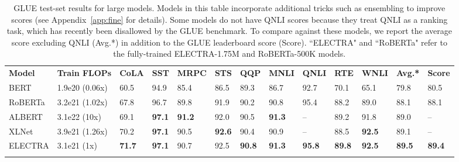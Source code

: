 \documentclass{article}
\newcommand\tstrut{\rule{0pt}{2.6ex}}
\newcommand\bstrut{\rule[-1.0ex]{0pt}{0pt}}
\newcommand{\thinline}{\Xhline{1.5\arrayrulewidth}}
\newcommand{\thickline}{\Xhline{2.5\arrayrulewidth}}
\newcommand{\tsep}	{\bstrut \\ \thinline}
\newcommand{\ttop}{\thickline}
\newcommand{\tbottom}{\bstrut \\ \thickline}
\begin{document}
\addtolength{\tabcolsep}{-3.5pt}
\begin{table}[t!]
\small
\begin{center}
\begin{tabularx}{\linewidth}{X l l l l l l l l l l l l}
\ttop 
\textbf{Model} & \textbf{Train FLOPs} & \textbf{CoLA} & \textbf{SST} & \textbf{MRPC} & \textbf{STS} & \textbf{QQP} & \textbf{MNLI} & \textbf{QNLI} & \textbf{RTE} & \textbf{WNLI} & \textbf{Avg.*} & \textbf{Score} \tstrut \tsep 
BERT      &  1.9e20 (0.06x)   & 60.5 & 94.9 & 85.4 & 86.5 & 89.3 & 86.7 & 92.7 & 70.1 & 65.1 & 79.8 & 80.5 \tstrut \\
RoBERTa      &  3.2e21 (1.02x)   & 67.8 & 96.7 & 89.8 & 91.9 & 90.2 & 90.8 & 95.4 & 88.2 & 89.0 & 88.1 & 88.1 \\
ALBERT      &  3.1e22 (10x)  & 69.1 & \textbf{97.1} & \textbf{91.2} & 92.0 & 90.5 & \textbf{91.3} & -- & 89.2 & 91.8 & 89.0 & -- \\
XLNet      & 3.9e21 (1.26x)    & 70.2 & \textbf{97.1} & 90.5 & \textbf{92.6} & 90.4 & 90.9 & -- & 88.5 & \textbf{92.5} & 89.1 & -- \tsep
ELECTRA &  3.1e21 (1x) & \textbf{71.7} & \textbf{97.1} & 90.7 & 92.5 & \textbf{90.8} & \textbf{91.3} & \textbf{95.8} & \textbf{89.8} & \textbf{92.5} & \textbf{89.5} & \textbf{89.4} \tstrut \tbottom
\end{tabularx} 
\end{center}
\vspace{-1mm}
\caption{GLUE test-set results for large models. 
Models in this table incorporate additional tricks such as ensembling to improve scores (see Appendix~\ref{app:fine} for details).
Some models do not have QNLI scores because they treat QNLI as a ranking task, which has recently been disallowed by the GLUE benchmark. To compare against these models, we report the average score excluding QNLI (Avg.*) in addition to the GLUE leaderboard score (Score). 
``ELECTRA" and ``RoBERTa" refer to the fully-trained ELECTRA-1.75M and RoBERTa-500K models.
}
\label{tab:test}
\end{table}
\addtolength{\tabcolsep}{3.5pt}
\vspace{-1mm}
\end{document}
